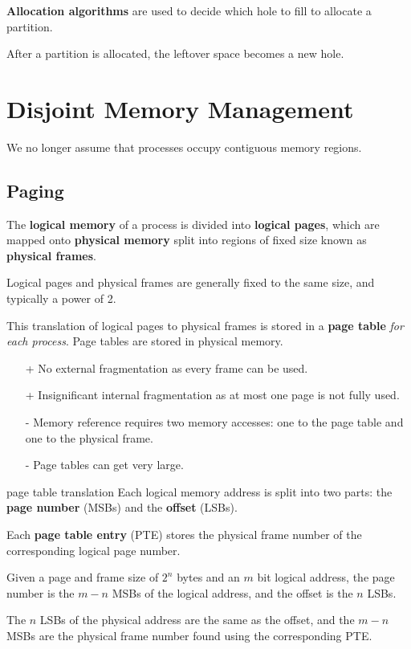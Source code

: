 \textbf{Allocation algorithms} are used to decide which hole to fill to allocate a partition.

\begin{itemize}
\end{itemize}

After a partition is allocated, the leftover space becomes a new hole.

\section{Disjoint Memory Management}
We no longer assume that processes occupy contiguous memory regions.


\subsection{Paging}
The \textbf{logical memory} of a process is divided into \textbf{logical pages}, which are mapped onto \textbf{physical memory} split into regions of fixed size known as \textbf{physical frames}.

Logical pages and physical frames are generally fixed to the same size, and typically a power of 2.

This translation of logical pages to physical frames is stored in a \textbf{page table} \textit{for each process}. Page tables are stored in physical memory.

\begin{itemize}
    \item[+] No external fragmentation as every frame can be used.
    \item[+] Insignificant internal fragmentation as at most one page is not fully used. 
    \item[-] Memory reference requires two memory accesses: one to the page table and one to the physical frame.
    \item[-] Page tables can get very large.
\end{itemize}

\begin{defn}{page table translation}
    Each logical memory address is split into two parts: the \textbf{page number} (MSBs) and the \textbf{offset} (LSBs).

    Each \textbf{page table entry} (PTE) stores the physical frame number of the corresponding logical page number.
    
    Given a page and frame size of $2^n$ bytes and an $m$ bit logical address, the page number is the $m - n$ MSBs of the logical address, and the offset is the $n$ LSBs.

    The $n$ LSBs of the physical address are the same as the offset, and the $m - n$ MSBs are the physical frame number found using the corresponding PTE.
\end{defn}

